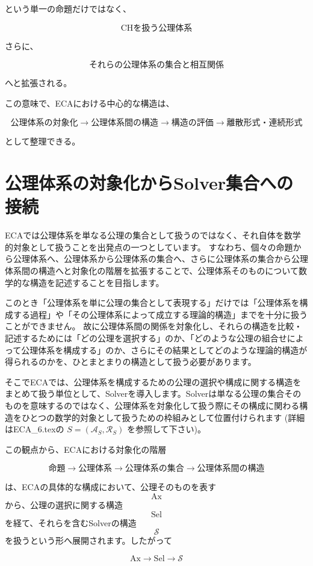 \documentclass[12pt,a4paper]{article}
\begin{document}
という単一の命題だけではなく、

\[
\text{CHを扱う公理体系}
\]

さらに、

\[
\text{それらの公理体系の集合と相互関係}
\]

へと拡張される。

この意味で、ECAにおける中心的な構造は、

\[
\boxed{
\text{公理体系の対象化}
\rightarrow
\text{公理体系間の構造}
\rightarrow
\text{構造の評価}
\rightarrow
\text{離散形式・連続形式}
}
\]

として整理できる。

\section{公理体系の対象化からSolver集合への接続}
ECAでは公理体系を単なる公理の集合として扱うのではなく、それ自体を数学的対象として扱うことを出発点の一つとしています。
すなわち、個々の命題から公理体系へ、公理体系から公理体系の集合へ、さらに公理体系の集合から公理体系間の構造へと対象化の階層を拡張することで、公理体系そのものについて数学的な構造を記述することを目指します。

このとき「公理体系を単に公理の集合として表現する」だけでは「公理体系を構成する過程」や「その公理体系によって成立する理論的構造」までを十分に扱うことができません。
故に公理体系間の関係を対象化し、それらの構造を比較・記述するためには「どの公理を選択する」のか、「どのような公理の組合せによって公理体系を構成する」のか、さらにその結果としてどのような理論的構造が得られるのかを、ひとまとまりの構造として扱う必要があります。

そこでECAでは、公理体系を構成するための公理の選択や構成に関する構造をまとめて扱う単位として、Solverを導入します。Solverは単なる公理の集合そのものを意味するのではなく、公理体系を対象化して扱う際にその構成に関わる構造をひとつの数学的対象として扱うための枠組みとして位置付けられます (詳細はECA_6.texの $S=(\mathcal{A}_S,\mathcal{R}_S)$ を参照して下さい)。

この観点から、ECAにおける対象化の階層

\[
\text{命題}
\longrightarrow
\text{公理体系}
\longrightarrow
\text{公理体系の集合}
\longrightarrow
\text{公理体系間の構造}
\]

は、ECAの具体的な構成において、公理そのものを表す
\[
\mathrm{Ax}
\]
から、公理の選択に関する構造
\[
\mathrm{Sel}
\]
を経て、それらを含むSolverの構造
\[
\mathcal{S}
\]
を扱うという形へ展開されます。したがって

\[
\mathrm{Ax}
\longrightarrow
\mathrm{Sel}
\longrightarrow
\mathcal{S}
\]
\end{document}
